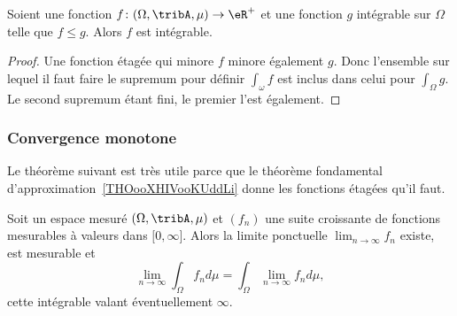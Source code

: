 \begin{proposition}      \label{PROPooGTMVooPHcrRl}
    Soient une fonction \( f\colon (\Omega,\tribA,\mu)\to \eR^+\) et une fonction \( g\) intégrable sur \( \Omega\) telle que \( f\leq g\). Alors \( f\) est intégrable.
\end{proposition}

\begin{proof}
    Une fonction étagée qui minore \( f\) minore également \( g\). Donc l'ensemble sur lequel il faut faire le supremum pour définir \( \int_{\omega}f\) est inclus dans celui pour \( \int_{\Omega}g\). Le second supremum étant fini, le premier l'est également.
\end{proof}

\subsubsection{Convergence monotone}

Le théorème suivant est très utile parce que le théorème fondamental d'approximation~\ref{THOooXHIVooKUddLi} donne les fonctions étagées qu'il faut.

\begin{theorem} \label{ThoRRDooFUvEAN}
    Soit un espace mesuré \( (\Omega,\tribA,\mu)\) et \( (f_n)\) une suite croissante de fonctions mesurables à valeurs dans \( \mathopen[ 0 , \infty \mathclose]\). Alors la limite ponctuelle \( \lim_{n\to \infty} f_n\) existe, est mesurable et
    \begin{equation}    \label{EqFHqCmLV}
        \lim_{n\to \infty} \int_{\Omega}f_nd\mu= \int_{\Omega}\lim_{n\to \infty} f_nd\mu,
    \end{equation}
    cette intégrable valant éventuellement \( \infty\).
\end{theorem}

